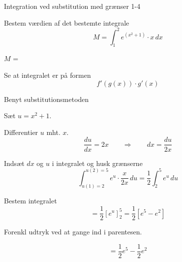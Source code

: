 \documentclass{article}
\begin{document}
\begin{exercise}{Integration ved substitution med grænser 1-4}
	
	
	Bestem værdien af det bestemte integrale
	\[
	M = \int_1^2 e^{(x^2+1)} \cdot x \, dx
	\]

	
	$M$ =  
	
	
	
	\hint
	
	Se at integralet er på formen
	\[
	f'(g(x)) \cdot g'(x)
	\]
	
	\hint
	
	Benyt substitutionsmetoden
	
	\hint
	
	Sæt $u=x^2+1$.
	
	
	\hint
	
	Differentier $u$ mht. $x$.
	\[
	\frac{du}{dx} = 2x \qquad	\Rightarrow \qquad dx = \frac{du}{2x}
	\]
	
	\hint
	
	Indsæt $dx$ og $u$ i integralet og husk grænserne
	\[
	\int_{u(1)=2}^{u(2)=5} e^{u} \cdot \frac{x}{2x} \, du = \frac{1}{2} \int_2^5 e^u \, du
	\]
	
	\hint
	
	Bestem integralet
	\[
	= \frac{1}{2} \left[ e^u \right]_2^5 = \frac{1}{2} \left[ e^5 - e^2  \right]
	\]
	
	\hint
	Forenkl udtryk ved at gange ind i parentesen.
	
	\hint
	
	\[
	= \frac{1}{2} e^5 - \frac{1}{2} e^2
	\]
	
\end{exercise}

\newpage
\end{document}
